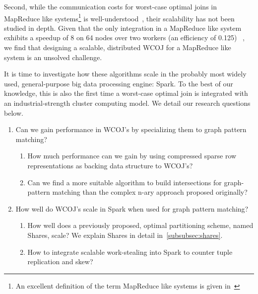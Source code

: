 Second, while the communication costs for worst-case optimal joins in MapReduce like systems\footnote{
An excellent definition of the term MapReduce like systems is given in~\cite{shares}}
is well-understood~\cite{shares,shares-skew,shares-proof,shares-skew-proof},
their scalability has not been studied in depth.
Given that the only integration in a MapReduce like system exhibits a speedup of 8 on 64 nodes over two workers (an efficiency of 0.125)
~\cite{myria-detailed},
we find that designing a scalable, distributed \textsc{WCOJ} for a MapReduce like system is an unsolved challenge.

It is time to investigate how these algorithms scale in the probably most widely used, general-purpose big data processing engine: Spark.
To the best of our knowledge, this is also the first time a worst-case optimal join is integrated with an industrial-strength cluster
computing model.
We detail our research questions below.

\begin{enumerate}
    \item Can we gain performance in \textsc{WCOJ}’s by specializing them to graph pattern matching?
    \begin{enumerate}
        \item How much performance can we gain by using compressed sparse row representations as backing data structure to \textsc{WCOJ}'s?
        \item Can we find a more suitable algorithm to build intersections for graph-pattern matching than the complex n-ary approach
         proposed originally?
    \end{enumerate}
    \item How well do \textsc{WCOJ}’s scale in Spark when used for graph pattern matching?
    \begin{enumerate}
        \item How well does a previously proposed, optimal partitioning scheme, named Shares, scale?
          We explain Shares in detail in~\cref{subsubsec:shares}.
        \item How to integrate scalable work-stealing into Spark to counter tuple replication and skew?
    \end{enumerate}
\end{enumerate}

